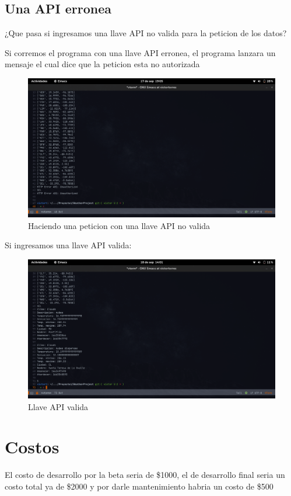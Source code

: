 \documentclass[12pt]{article}
\begin{document}
\subsection{Una API erronea}
¿Que pasa si ingresamos una llave API no valida para la peticion de los datos?

Si corremos el programa con una llave API erronea, el programa lanzara un mensaje el cual dice que la peticion esta no autorizada
\begin{figure}[ht]
  \centering
  \includegraphics[scale=0.5]{figures/apimal}
  \caption{Haciendo una peticion con una llave API no valida}
\end{figure}
\newpage
Si ingresamos una llave API valida:
\begin{figure}[ht]
  \centering
  \includegraphics[scale=0.3]{figures/pruebaBuena}
  \caption{Llave API valida}
\end{figure}

\section{Costos}
El costo de desarrollo por la beta seria de \$1000, el de desarrollo final seria un costo total ya de \$2000 y por darle mantenimiento habria un costo de \$500
\end{document}
